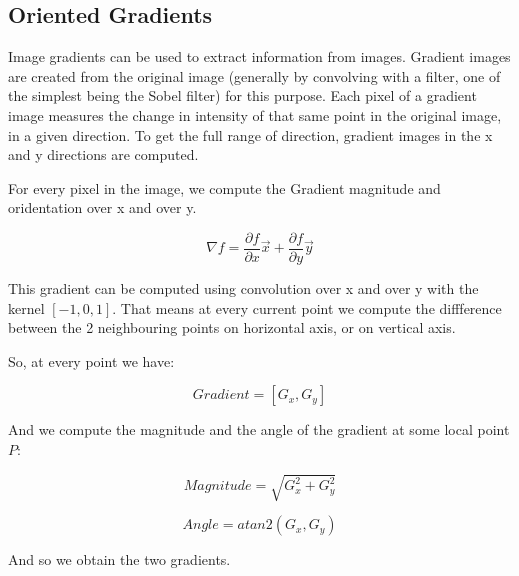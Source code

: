
\subsection{Oriented Gradients}

Image gradients can be used to extract information from images. Gradient images are created from the original image (generally by convolving with a filter, one of the simplest being the Sobel filter) for this purpose. Each pixel of a gradient image measures the change in intensity of that same point in the original image, in a given direction. To get the full range of direction, gradient images in the x and y directions are computed.

For every pixel in the image, we compute the Gradient magnitude and oridentation over x and over y. 


\begin{equation}
\label{eq:gradient}
\nabla f = \frac{\partial f}{\partial x} \vec{x} + \frac{\partial f}{\partial y}\vec{y}  
\end{equation}

This gradient can be computed using convolution over x and over y with the kernel $ [-1, 0, 1] $. That means at every current point we compute the diffference between the  2 neighbouring points on horizontal axis, or on vertical axis.

So, at every point we have:

\begin{equation}
\label{eq:gradient}
Gradient = [G_x, G_y]  
\end{equation}

And we compute the magnitude and the angle of the gradient at some local point $P$:

\begin{equation}
\label{eq:gradient}
Magnitude = \sqrt{G_{x}^2 + G_{y}^2}
\end{equation}

\begin{equation}
\label{eq:gradient}
Angle = atan2(G_{x}, G_{y})
\end{equation}

And so we obtain the two gradients.

